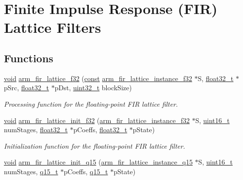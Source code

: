 \hypertarget{group___f_i_r___lattice}{\section{Finite Impulse Response (F\-I\-R) Lattice Filters}
\label{group___f_i_r___lattice}
}
\subsection*{Functions}
\begin{DoxyCompactItemize}
\item 
\hyperlink{group___n_a_m_e_ga18028b8badbf1ea7e704ccac3c488e82}{void} \hyperlink{group___f_i_r___lattice_gae63a45a63a11a65f2eae8b8b1fe370a8}{arm\-\_\-fir\-\_\-lattice\-\_\-f32} (\hyperlink{group___n_a_m_e_ga7ae6d0e43244213b34de2c2b9aa30da6}{const} \hyperlink{structarm__fir__lattice__instance__f32}{arm\-\_\-fir\-\_\-lattice\-\_\-instance\-\_\-f32} $\ast$S, \hyperlink{arm__math_8h_a4611b605e45ab401f02cab15c5e38715}{float32\-\_\-t} $\ast$p\-Src, \hyperlink{arm__math_8h_a4611b605e45ab401f02cab15c5e38715}{float32\-\_\-t} $\ast$p\-Dst, \hyperlink{stdint_8h_a435d1572bf3f880d55459d9805097f62}{uint32\-\_\-t} block\-Size)
\begin{DoxyCompactList}\small\item\em Processing function for the floating-\/point F\-I\-R lattice filter. \end{DoxyCompactList}\item 
\hyperlink{group___n_a_m_e_ga18028b8badbf1ea7e704ccac3c488e82}{void} \hyperlink{group___f_i_r___lattice_ga86199a1590af2b8941c6532ee9d03229}{arm\-\_\-fir\-\_\-lattice\-\_\-init\-\_\-f32} (\hyperlink{structarm__fir__lattice__instance__f32}{arm\-\_\-fir\-\_\-lattice\-\_\-instance\-\_\-f32} $\ast$S, \hyperlink{stdint_8h_a273cf69d639a59973b6019625df33e30}{uint16\-\_\-t} num\-Stages, \hyperlink{arm__math_8h_a4611b605e45ab401f02cab15c5e38715}{float32\-\_\-t} $\ast$p\-Coeffs, \hyperlink{arm__math_8h_a4611b605e45ab401f02cab15c5e38715}{float32\-\_\-t} $\ast$p\-State)
\begin{DoxyCompactList}\small\item\em Initialization function for the floating-\/point F\-I\-R lattice filter. \end{DoxyCompactList}\item 
\hyperlink{group___n_a_m_e_ga18028b8badbf1ea7e704ccac3c488e82}{void} \hyperlink{group___f_i_r___lattice_ga1b22f30ce1cc19bf5a5d7c9fca154d72}{arm\-\_\-fir\-\_\-lattice\-\_\-init\-\_\-q15} (\hyperlink{structarm__fir__lattice__instance__q15}{arm\-\_\-fir\-\_\-lattice\-\_\-instance\-\_\-q15} $\ast$S, \hyperlink{stdint_8h_a273cf69d639a59973b6019625df33e30}{uint16\-\_\-t} num\-Stages, \hyperlink{arm__math_8h_ab5a8fb21a5b3b983d5f54f31614052ea}{q15\-\_\-t} $\ast$p\-Coeffs, \hyperlink{arm__math_8h_ab5a8fb21a5b3b983d5f54f31614052ea}{q15\-\_\-t} $\ast$p\-State)

\end{DoxyCompactItemize}

